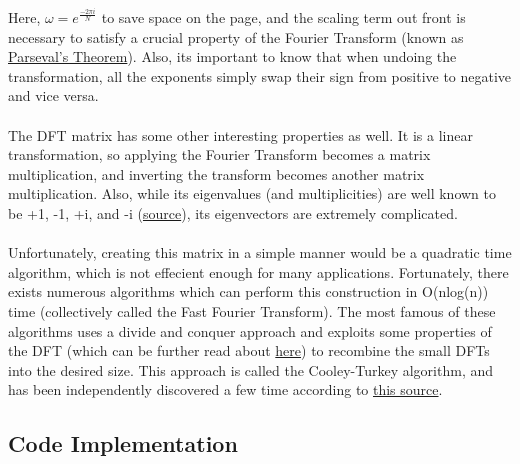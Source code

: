 \documentclass[notitlepage]{article}
\begin{document}
Here, $\omega = e^{\frac{-2\pi{i}}{N}}$ to save space on the page, and the scaling term out front is
necessary to satisfy a crucial property of the Fourier Transform (known as \href{https://en.wikipedia.org/wiki/Parseval%27s_theorem}{Parseval's Theorem}).
Also, its important to know that when undoing the transformation, all the exponents simply swap their sign
from positive to negative and vice versa.
\\\\
The DFT matrix has some other interesting properties as well. It is a linear transformation, so applying the
Fourier Transform becomes a matrix multiplication, and inverting the transform becomes another matrix multiplication.
Also, while its eigenvalues (and multiplicities) are well known to be +1, -1, +i, and -i (\href{https://users.metu.edu.tr/ccandan/pub_dir/Eig_Structure_DFT_IEEE_SPM_Column_March2011.pdf}{source}), its eigenvectors are extremely complicated.
\\\\
Unfortunately, creating this matrix in a simple manner would be a quadratic time algorithm, which
is not effecient enough for many applications. Fortunately, there exists numerous
algorithms which can perform this construction in O(nlog(n)) time (collectively called the Fast Fourier Transform).
The most famous of these algorithms
uses a divide and conquer approach and exploits some properties of the DFT (which can be further
read about \href{https://vanhunteradams.com/FFT/FFT.html#The-Cooley-Tukey-FFT}{here}) to recombine
the small DFTs into the desired size. This approach is called the Cooley-Turkey algorithm, and has
been independently discovered a few time according to \href{https://faculty.washington.edu/seattle/physics541/%202010-Fourier-transforms/history-3.pdf}{this source}.

\subsection{Code Implementation}
\end{document}
